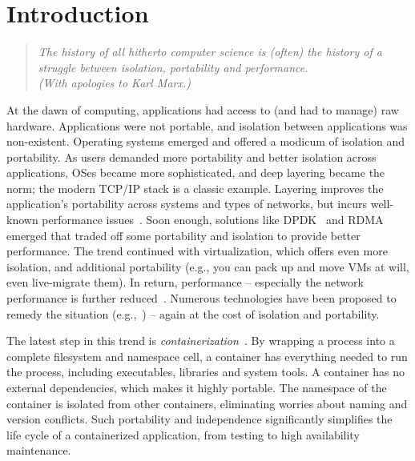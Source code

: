 \section{Introduction} 
\label{sec:introduction}

\begin{quote}
{\em 
The history of all hitherto computer science is (often) the history of a
struggle between isolation, portability and performance. \\ 
(With apologies to Karl Marx.)}
\end{quote}

At the dawn of computing, applications had access to (and had to manage) raw
hardware. Applications were not portable, and isolation between applications was
non-existent. Operating systems emerged and offered a modicum of isolation and
portability. As users demanded more portability and better isolation across
applications, OSes became more sophisticated, and deep layering became the norm;
the modern TCP/IP stack is a classic example. Layering improves the
application's portability across systems and types of networks, but incurs
well-known performance issues~\cite{dcqcn,netmap}. Soon enough, solutions
like DPDK~\cite{dpdk} and RDMA~\cite{rdma} emerged that traded off some
portability and isolation to provide better performance. The trend continued
with virtualization, which offers even more isolation, and additional
portability (e.g., you can pack up and move VMs at will, even live-migrate
them). In return, performance -- especially the network performance is further
reduced~\cite{netvm}. Numerous technologies have been proposed to remedy the
situation (e.g.,~\cite{sriov,netvm,netmap,dpdk}) -- again at the cost of
isolation and portability.

The latest step in this trend is {\em containerization}~\cite{docker,kubernetes,coreos}. By wrapping
a process into a complete filesystem and namespace cell, a container has
everything needed to run the process, including executables, libraries and
system tools. A container has no external dependencies, which makes it highly
portable. The namespace of the container is isolated from other containers,
eliminating worries about naming and version conflicts. Such portability and
independence significantly simplifies the life cycle of a containerized
application, from testing to high availability maintenance. 

